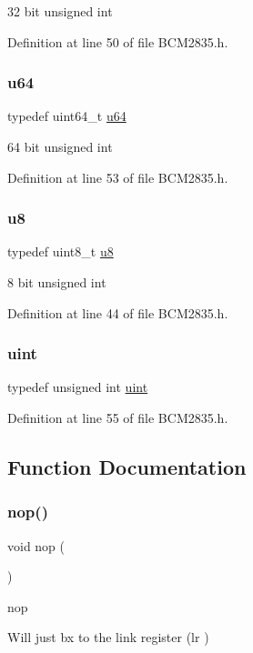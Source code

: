 32 bit unsigned int 



Definition at line 50 of file B\+C\+M2835.\+h.

\mbox{\label{group__Common_ga3f7e2bcbb0b4c338f3c4f6c937cd4234}} 
\subsubsection{\texorpdfstring{u64}{u64}}
{\footnotesize\ttfamily typedef uint64\+\_\+t \hyperlink{group__Common_ga3f7e2bcbb0b4c338f3c4f6c937cd4234}{u64}}



64 bit unsigned int 



Definition at line 53 of file B\+C\+M2835.\+h.

\mbox{\label{group__Common_ga92c50087ca0e64fa93fc59402c55f8ca}} 
\subsubsection{\texorpdfstring{u8}{u8}}
{\footnotesize\ttfamily typedef uint8\+\_\+t \hyperlink{group__Common_ga92c50087ca0e64fa93fc59402c55f8ca}{u8}}



8 bit unsigned int 



Definition at line 44 of file B\+C\+M2835.\+h.

\mbox{\label{group__Common_ga91ad9478d81a7aaf2593e8d9c3d06a14}} 
\subsubsection{\texorpdfstring{uint}{uint}}
{\footnotesize\ttfamily typedef unsigned int \hyperlink{group__Common_ga91ad9478d81a7aaf2593e8d9c3d06a14}{uint}}



Definition at line 55 of file B\+C\+M2835.\+h.



\subsection{Function Documentation}
\mbox{\label{group__Common_ga9feb7476507383309c8e3ff2648016f3}} 
\subsubsection{\texorpdfstring{nop()}{nop()}}
{\footnotesize\ttfamily void nop (\begin{DoxyParamCaption}{ }\end{DoxyParamCaption})}



nop 

Will just {\ttfamily bx} {\ttfamily to} the link register ({\ttfamily lr} {\ttfamily }) 